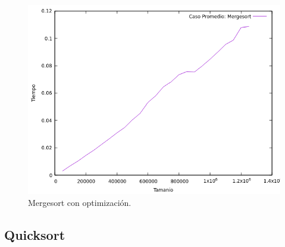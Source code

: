 \documentclass[a4paper,12pt,twoside]{article} %
\begin{document}
\begin{itemize}
\begin{figure}[h]
\begin{center}
  	\includegraphics[scale=0.8]{mergesort_me_co.png}
  	\caption{Mergesort con optimización.}
  	
  \end{center}
\end{figure}
	
\end{itemize}
\newpage
	
	\subsection{Quicksort}
	
\end{document}
